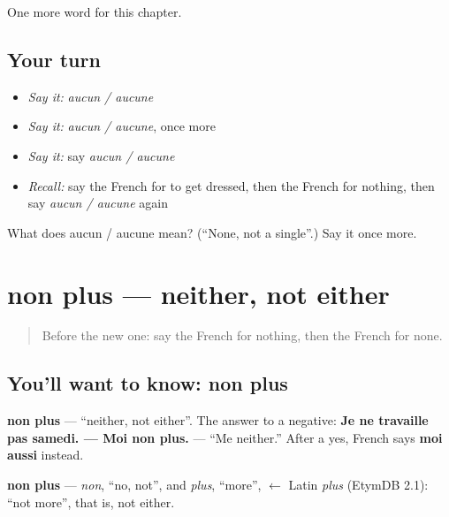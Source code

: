 \begin{grammarlens}[title={What you've built}]
One more word for this chapter.
\end{grammarlens}

\subsection*{Your turn}
\begin{itemize}
\raggedright
  \item \emph{Say it:} \emph{aucun / aucune}
  \item \emph{Say it:} \emph{aucun / aucune}, once more
  \item \emph{Say it:} say \emph{aucun / aucune}
  \item \emph{Recall:} say the French for to get dressed, then the French for nothing, then say \emph{aucun / aucune} again
\end{itemize}

\begin{tcolorbox}[breakable,colback=teal!4,colframe=teal!35!black,title={Before you move on}]
What does aucun / aucune mean? (\textquotedblleft{}None, not a single\textquotedblright{}.) Say it once more.
\end{tcolorbox}
\section[non plus]{non plus — neither, not either}

\label{lesson:FR-C139-non-plus}



\begin{quote}
Before the new one: say the French for nothing, then the French for none.
\end{quote}

\subsection*{You'll want to know: non plus}
\textbf{non plus} — \textquotedblleft{}neither, not either\textquotedblright{}. The answer to a negative: \textbf{Je ne travaille pas samedi. — Moi non plus.} — \textquotedblleft{}Me neither.\textquotedblright{} After a yes, French says \textbf{moi aussi} instead.

\begin{cousinweb}
\textbf{non plus} — \emph{non}, \textquotedblleft{}no, not\textquotedblright{}, and \emph{plus}, \textquotedblleft{}more\textquotedblright{}, $\leftarrow$ Latin \emph{plus} (EtymDB 2.1): \textquotedblleft{}not more\textquotedblright{}, that is, not either.
\end{cousinweb}

